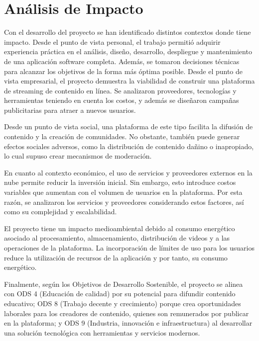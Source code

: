 \chapter{Análisis de Impacto}

Con el desarrollo del proyecto se han identificado distintos contextos donde tiene impacto. Desde el punto de vista personal, el trabajo permitió adquirir experiencia práctica en el análisis, diseño, desarrollo, despliegue y mantenimiento de una aplicación software completa. Además, se tomaron decisiones técnicas para alcanzar los objetivos de la forma más óptima posible. Desde el punto de vista empresarial, el proyecto demuestra la viabilidad de construir una plataforma de streaming de contenido en línea. Se analizaron proveedores, tecnologías y herramientas teniendo en cuenta los costos, y además se diseñaron campañas publicitarias para atraer a nuevos usuarios. 

Desde un punto de vista social, una plataforma de este tipo facilita la difusión de contenido y la creación de comunidades. No obstante, también puede generar efectos sociales adversos, como la distribución de contenido dañino o inapropiado, lo cual supuso crear mecanismos de moderación.  

En cuanto al contexto económico, el uso de servicios y proveedores externos en la nube permite reducir la inversión inicial. Sin embargo, esto introduce costos variables que aumentan con el volumen de usuarios en la plataforma. Por esta razón, se analizaron los servicios y proveedores considerando estos factores, así como su complejidad y escalabilidad. 

El proyecto tiene un impacto medioambiental debido al consumo energético asociado al procesamiento, almacenamiento, distribución de videos y a las operaciones de la plataforma. La incorporación de límites de uso para los usuarios reduce la utilización de recursos de la aplicación y por tanto, su consumo energético. 

Finalmente, según los Objetivos de Desarrollo Sostenible, el proyecto se alinea con ODS 4 (Educación de calidad) por su potencial para difundir contenido educativo; ODS 8 (Trabajo decente y crecimiento) porque crea oportunidades laborales para los creadores de contenido, quienes son remunerados por publicar en la plataforma; y ODS 9 (Industria, innovación e infraestructura) al desarrollar una solución tecnológica con herramientas y servicios modernos. 



                        
